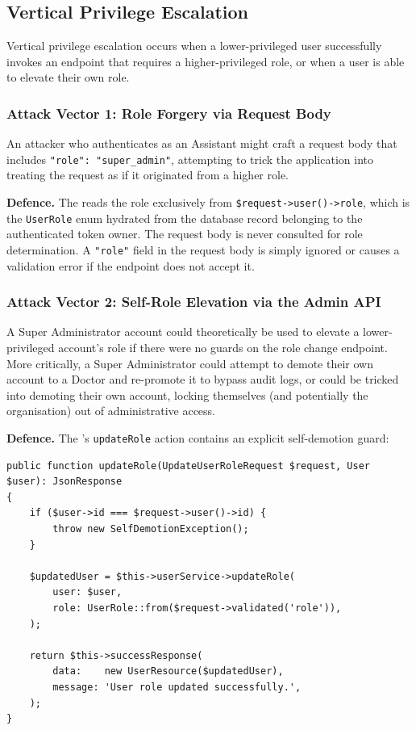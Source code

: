 \subsection{Vertical Privilege Escalation}

Vertical privilege escalation occurs when a lower-privileged user
successfully invokes an endpoint that requires a higher-privileged role,
or when a user is able to elevate their own role.

\subsubsection{Attack Vector 1: Role Forgery via Request Body}

An attacker who authenticates as an Assistant might craft a request body
that includes \texttt{"role": "super\_admin"}, attempting to trick the
application into treating the request as if it originated from a higher
role.

\textbf{Defence.} The  reads the role
exclusively from \texttt{\$request->user()->role}, which is the
\texttt{UserRole} enum hydrated from the database record belonging to
the authenticated token owner. The request body is never consulted for
role determination. A \texttt{"role"} field in the request body is
simply ignored or causes a validation error if the endpoint does not
accept it.

\subsubsection{Attack Vector 2: Self-Role Elevation via the Admin API}

A Super Administrator account could theoretically be used to elevate a
lower-privileged account's role if there were no guards on the role
change endpoint. More critically, a Super Administrator could attempt to
demote their own account to a Doctor and re-promote it to bypass audit
logs, or could be tricked into demoting their own account, locking
themselves (and potentially the organisation) out of administrative
access.

\textbf{Defence.} The 's \texttt{updateRole}
action contains an explicit self-demotion guard:

\begin{lstlisting}[style=php, caption={Self-demotion guard in
  \texttt{UserController::updateRole()}.}]
public function updateRole(UpdateUserRoleRequest $request, User $user): JsonResponse
{
    if ($user->id === $request->user()->id) {
        throw new SelfDemotionException();
    }

    $updatedUser = $this->userService->updateRole(
        user: $user,
        role: UserRole::from($request->validated('role')),
    );

    return $this->successResponse(
        data:    new UserResource($updatedUser),
        message: 'User role updated successfully.',
    );
}
\end{lstlisting}

